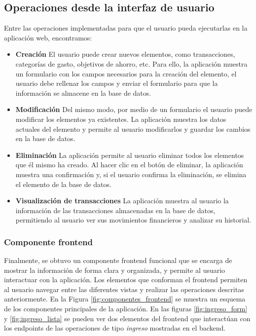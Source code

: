 \subsection{Operaciones desde la interfaz de usuario}
Entre las operaciones implementadas para que el usuario pueda ejecutarlas en la aplicación web, encontramos:

\begin{itemize}
    \item \textbf{Creación}
        El usuario puede crear nuevos elementos, como transacciones, categorías de gasto, objetivos de ahorro, etc. Para ello, la aplicación muestra un formulario con los campos necesarios para la creación del elemento, el usuario debe rellenar los campos y enviar el formulario para que la información se almacene en la base de datos.        
    \item \textbf{Modificación}
        Del mismo modo, por medio de un formulario el usuario puede modificar los elementos ya existentes. La aplicación muestra los datos actuales del elemento y permite al usuario modificarlos y guardar los cambios en la base de datos.
    \item \textbf{Eliminación}
        La aplicación permite al usuario eliminar todos los elementos que él mismo ha creado. Al hacer clic en el botón de eliminar, la aplicación muestra una confirmación y, si el usuario confirma la eliminación, se elimina el elemento de la base de datos.
    \item \textbf{Visualización de transacciones}
        La aplicación muestra al usuario la información de las transacciones almacenadas en la base de datos, permitiendo al usuario ver sus movimientos financieros y analizar su historial.        
\end{itemize}

\subsubsection{Componente frontend}
Finalmente, se obtuvo un componente frontend funcional que se encarga de mostrar la información de forma clara y organizada, y permite al usuario interactuar con la aplicación. Los elementos que conforman el frontend permiten al usuario navegar entre las diferentes vistas y realizar las operaciones descritas anteriormente. En la Figura \ref{fig:componentes_frontend} se muestra un esquema de los componentes principales de la aplicación. En las figuras \ref{fig:ingreso_form} y \ref{fig:ingreso_lista} se pueden ver dos elementos del frontend que interactúan con los endpoints de las operaciones de tipo \textit{ingreso} mostradas en el backend.

